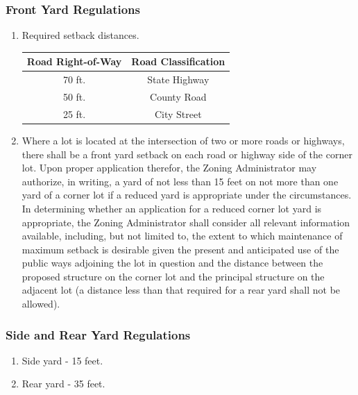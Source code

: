 \subsubsection{Front Yard Regulations}
\begin{enumerate}[{\indent}a)]
    \item Required setback distances.        
        \begin{center}
        \begin{tabular}{|c|c|}
            \hline
            \textbf{Road Right-of-Way} & \textbf{Road Classification}\\
            \hline
            70 ft. & State Highway\\
            \hline
            50 ft. & County Road\\
            \hline
            25 ft. & City Street\\
            \hline
        \end{tabular}
        \end{center}
    \item Where a lot is located at the intersection of two or more roads or highways, there shall be a front yard setback on each road or highway side of the corner lot.  Upon proper application therefor, the Zoning Administrator may authorize, in writing, a yard of not less than 15 feet on not more than one yard of a corner lot if a reduced yard is appropriate under the circumstances. In determining whether an application for a reduced corner lot yard is appropriate, the Zoning Administrator shall consider all relevant information available, including, but not limited to, the extent to which maintenance of maximum setback is desirable given the present and anticipated use of the public ways adjoining the lot in question and the distance between the proposed structure on the corner lot and the principal structure on the adjacent lot (a distance less than that required for a rear yard shall not be allowed).
\end{enumerate}
\subsubsection{Side and Rear Yard Regulations}
\begin{enumerate}[{\indent}a)]
    \item Side yard - 15 feet.
    \item Rear yard - 35 feet.
\end{enumerate}
